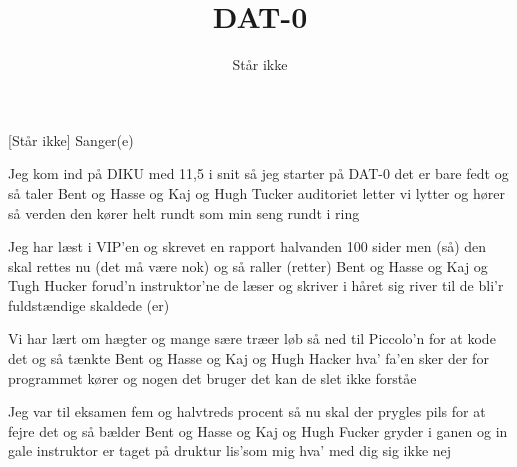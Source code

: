\documentclass[a4paper,11pt]{article}
\title{DAT-0}
\author{Står ikke}
\begin{document}
\maketitle

\begin{roles}
[Står ikke] Sanger(e)
\end{roles}


\begin{song}
%
Jeg kom ind på DIKU
med 11,5 i snit
så jeg starter på DAT-0
det er bare fedt 
og så taler
Bent og Hasse
og Kaj og Hugh Tucker
auditoriet letter
vi lytter og hører
så verden den kører
helt rundt som min seng rundt i ring

Jeg har læst i VIP'en
og skrevet en rapport
halvanden 100 sider men (så)
den skal rettes nu (det må være nok)
og så raller (retter)
Bent og Hasse
og Kaj og Tugh Hucker
forud'n instruktor'ne
de læser og skriver
i håret sig river
til de bli'r fuldstændige skaldede (er)

Vi har lært om hægter
og mange sære træer
løb så ned til Piccolo'n
for at kode det
og så tænkte
Bent og Hasse
og Kaj og Hugh Hacker
hva' fa'en sker der
for programmet kører
og nogen det bruger
det kan de slet ikke forståe

Jeg var til eksamen
fem og halvtreds procent
så nu skal der prygles pils
for at fejre det
og så bælder
Bent og Hasse
og Kaj og Hugh Fucker
gryder i ganen
og in gale instruktor
er taget på druktur
lis'som mig hva' med dig sig ikke nej

\end{song}
\end{document}
